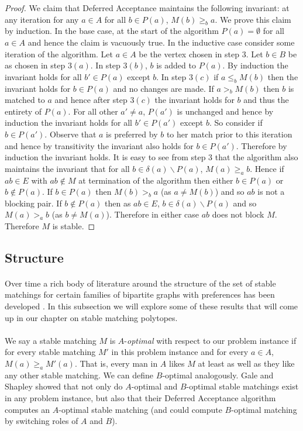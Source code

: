 \begin{proof}
We claim that Deferred Acceptance maintains the following invariant: at any iteration for any $a \in A$ for all $b \in P(a)$, $M(b) \geq_b a$. We prove this claim by induction. In the base case, at the start of the algorithm $P(a) = \emptyset$ for all $a \in A$ and hence the claim is vacuously true. In the inductive case consider some iteration of the algorithm. Let $a\in A$ be the vertex chosen in step $3$. Let $b \in B$ be as chosen in step $3(a)$. In step $3(b)$, $b$ is added to $P(a)$. By induction the invariant holds for all $b' \in P(a)$ except $b$. In step $3(c)$ if $a \leq_b M(b)$ then the invariant holds for $b \in P(a)$ and no changes are made. If $a >_b M(b)$ then $b$ is matched to $a$ and hence after step $3(c)$ the invariant holds for $b$ and thus the entirety of $P(a)$. For all other $a' \neq a$, $P(a')$ is unchanged and hence by induction the invariant holds for all $b' \in P(a')$ except $b$. So consider if $b \in P(a')$. Observe that $a$ is preferred by $b$ to her match prior to this iteration and hence by transitivity the invariant also holds for $b \in P(a')$. Therefore by induction the invariant holds. It is easy to see from step $3$ that the algorithm also maintains the invariant that for all $b \in \delta(a)\backslash P(a)$, $M(a) \geq_a b$. Hence if $ab \in E$ with $ab \not\in M$ at termination of the algorithm then either $b \in P(a)$ or $b \not\in P(a)$. If $b \in P(a)$ then $M(b) >_b a$ (as $a \neq M(b)$) and so $ab$ is not a blocking pair. If $b \not\in P(a)$ then as $ab \in E$, $b \in \delta(a) \backslash P(a)$ and so $M(a) >_a b$ (as $b \neq M(a)$). Therefore in either case $ab$ does not block $M$. Therefore $M$ is stable.
\end{proof}
\subsection{Structure}\label{SM:STRUCTURE}
\paragraph{}
Over time a rich body of literature around the structure of the set of stable matchings for certain families of bipartite graphs with preferences has been developed \cite{roth1992two}. In this subsection we will explore some of these results that will come up in our chapter on stable matching polytopes.

\paragraph{}
We say a stable matching $M$ is $A$-{\it optimal} with respect to our problem instance if for every stable matching $M'$ in this problem instance and for every $a \in A$, $M(a) \geq_a M'(a)$. That is, every man in $A$ likes $M$ at least as well as they like any other stable matching. We can define $B$-optimal analogously. Gale and Shapley showed that not only do $A$-optimal and $B$-optimal stable matchings exist in any problem instance, but also that their Deferred Acceptance algorithm computes an $A$-optimal stable matching \cite{gale1962college} (and could compute $B$-optimal matching by switching roles of $A$ and $B$).


